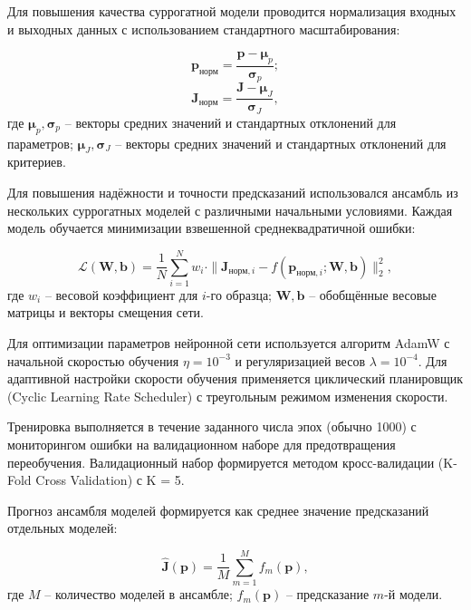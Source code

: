 Для повышения качества суррогатной модели проводится нормализация
входных и выходных данных с использованием стандартного масштабирования:

\begin{equation}
	\mathbf{p}_\text{норм} = \frac{\mathbf{p} - \boldsymbol{\mu}_p}{\boldsymbol{\sigma}_p};
\end{equation}
\begin{equation}
	\mathbf{J}_\text{норм} = \frac{\mathbf{J} - \boldsymbol{\mu}_J}{\boldsymbol{\sigma}_J},
\end{equation}
где $\boldsymbol{\mu}_p, \boldsymbol{\sigma}_p$ -- векторы средних значений и стандартных отклонений для параметров;
$\boldsymbol{\mu}_J, \boldsymbol{\sigma}_J$ -- векторы средних значений и стандартных отклонений для критериев.

Для повышения надёжности и точности предсказаний использовался ансамбль из нескольких суррогатных
моделей с различными начальными условиями. Каждая модель обучается минимизации взвешенной среднеквадратичной ошибки:

\begin{equation}
	\mathcal{L}(\mathbf{W}, \mathbf{b}) = \frac{1}{N} \sum_{i=1}^N w_i \cdot \|\mathbf{J}_{\text{норм},i} - f(\mathbf{p}_{\text{норм},i}; \mathbf{W}, \mathbf{b})\|_2^2,
\end{equation}
где $w_i$ -- весовой коэффициент для $i$-го образца;
$\mathbf{W}, \mathbf{b}$ -- обобщённые весовые матрицы и векторы смещения сети.

Для оптимизации параметров нейронной сети используется алгоритм AdamW с
начальной скоростью обучения $\eta = 10^{-3}$ и регуляризацией весов $\lambda = 10^{-4}$.
Для адаптивной настройки скорости обучения применяется циклический планировщик
(Cyclic Learning Rate Scheduler) с треугольным режимом изменения скорости.

Тренировка выполняется в течение заданного числа эпох (обычно 1000) с
мониторингом ошибки на валидационном наборе для предотвращения переобучения. Валидационный
набор формируется методом кросс-валидации (K-Fold Cross Validation) с K = 5.

Прогноз ансамбля моделей формируется как
среднее значение предсказаний отдельных моделей:

\begin{equation}
	\hat{\mathbf{J}}(\mathbf{p}) = \frac{1}{M} \sum_{m=1}^M f_m(\mathbf{p}),
\end{equation}
где $M$ -- количество моделей в ансамбле;
$f_m(\mathbf{p})$ -- предсказание $m$-й модели.


